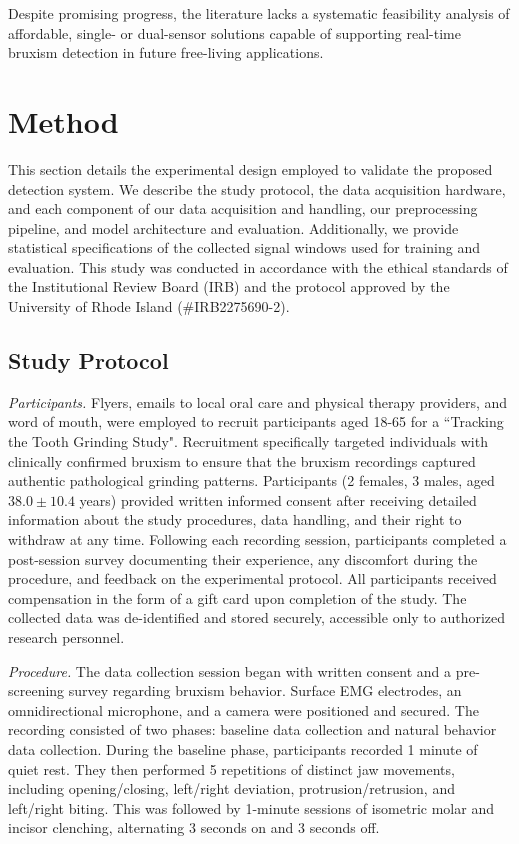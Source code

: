 \documentclass[pdflatex,sn-vancouver-num, iicol]{sn-jnl}
\begin{document}
Despite promising progress, the literature lacks a systematic feasibility analysis of affordable, single- or dual-sensor solutions capable of supporting real-time bruxism detection in future free-living applications.




\section{Method}

This section details the experimental design employed to validate the proposed detection system. We describe the study protocol, the data acquisition hardware, and each component of our data acquisition and handling, our preprocessing pipeline, and model architecture and evaluation. Additionally, we provide statistical specifications of the collected signal windows used for training and evaluation.  This study was conducted in accordance with the ethical standards of the Institutional Review Board (IRB) and the protocol approved by the University of Rhode Island (\#IRB2275690-2). 

\subsection{Study Protocol}
\textit{Participants.} Flyers, emails to local oral care and physical therapy providers, and word of mouth, were employed to recruit participants aged 18-65 for a ``Tracking the Tooth Grinding Study". Recruitment specifically targeted individuals with clinically confirmed bruxism to ensure that the bruxism recordings captured authentic pathological grinding patterns. Participants (2 females, 3 males, aged $38.0 \pm 10.4$ years) provided written informed consent after receiving detailed information about the study procedures, data handling, and their right to withdraw at any time. Following each recording session, participants completed a post-session survey documenting their experience, any discomfort during the procedure, and feedback on the experimental protocol. All participants received compensation in the form of a gift card upon completion of the study. The collected data was de-identified and stored securely, accessible only to authorized research personnel.

\textit{Procedure.} The data collection session began with written consent and a pre-screening survey regarding bruxism behavior. Surface EMG electrodes, an omnidirectional microphone, and a camera were positioned and secured. The recording consisted of two phases: baseline data collection and natural behavior data collection. During the baseline phase, participants recorded 1 minute of quiet rest. They then performed 5 repetitions of distinct jaw movements, including opening/closing, left/right deviation, protrusion/retrusion, and left/right biting. This was followed by 1-minute sessions of isometric molar and incisor clenching, alternating 3 seconds on and 3 seconds off. 
\end{document}
